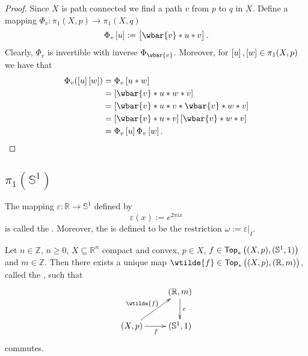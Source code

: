 \begin{proof}
	Since $X$ is path connected we find a path $v$ from $p$ to $q$ in $X$. Define a mapping $\Phi_v : \pi_1(X,p) \to \pi_1(X,q)$ 
	\begin{equation*}
		\Phi_v\sbr{u} := \sbr{\wbar{v} \ast u \ast v}.
	\end{equation*}
	Clearly, $\Phi_v$ is invertible with inverse $\Phi_{\wbar{v}}$. Moreover, for $\sbr{u},\sbr{w} \in \pi_1(X,p)$ we have that
	\begin{align*}
		\Phi_v(\sbr{u}\sbr{w}) &= \Phi_v\sbr{u \ast w}\\
		&= \sbr[0]{\wbar{v} \ast u \ast w \ast v}\\
		&= \sbr[0]{\wbar{v} \ast u \ast v \ast \wbar{v} \ast w \ast v}\\
		&= \sbr[0]{\wbar{v} \ast u \ast v}\sbr[0]{\wbar{v} \ast w \ast v}\\
		&= \Phi_v\sbr{u}\Phi_v\sbr{w}.
	\end{align*}
\end{proof}

\subsection*{$\pi_1(\mathbb{S}^1)$}  

\begin{definition}
	The mapping $\varepsilon : \mathbb{R} \to \mathbb{S}^1$ defined by
	\begin{equation}
		\varepsilon(x) := e^{2\pi i x}
	\end{equation}
	\noindent is called the . Moreover, the  is  defined to be the restriction $\omega := \varepsilon\vert_I$.
\end{definition}

\begin{proposition}
	Let $n \in \mathbb{Z}$, $n \geq 0$, $X \subseteq \mathbb{R}^n$ compact and convex, $p \in X$, $f \in \mathsf{Top}_\ast\del[1]{(X,p),(\mathbb{S}^1,1)}$ and $m \in \mathbb{Z}$. Then there exists a unique map $\wtilde{f} \in \mathsf{Top}_\ast\del[1]{(X,p),(\mathbb{R},m)}$, called the , such that 
	\begin{equation*}
		\centering
		\xymatrix{
			& (\mathbb{R},m) \ar[d]^\varepsilon\\
			(X,p) \ar[r]_f\ar[ur]^{\wtilde{f}}	& (\mathbb{S}^1,1)
		}
		\end{equation*}
		\noindent commutes. 
		\label{prop:lifting_circle}
	\end{proposition}

